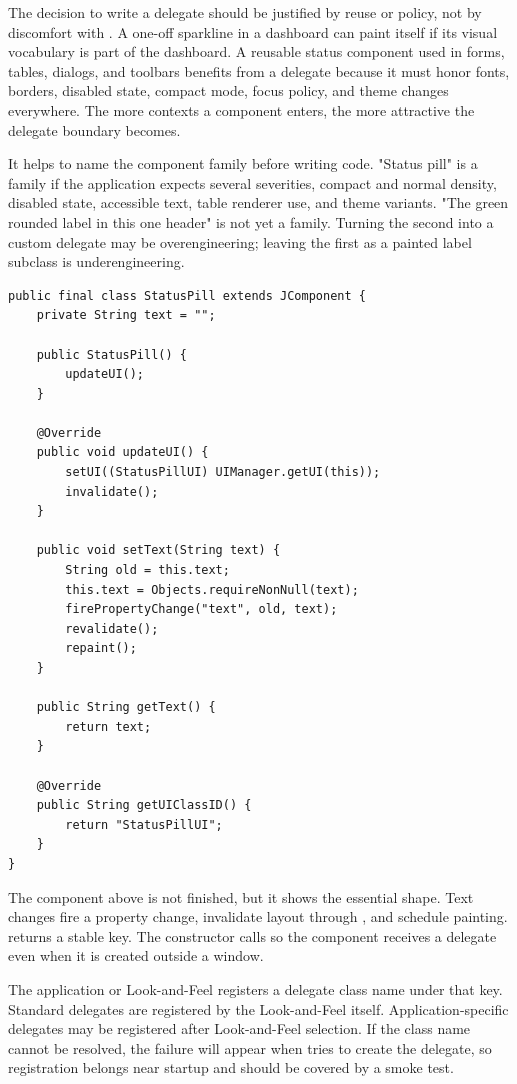 The decision to write a delegate should be justified by reuse or policy, not by discomfort with . A one-off sparkline in a dashboard can paint itself if its visual vocabulary is part of the dashboard. A reusable status component used in forms, tables, dialogs, and toolbars benefits from a delegate because it must honor fonts, borders, disabled state, compact mode, focus policy, and theme changes everywhere. The more contexts a component enters, the more attractive the delegate boundary becomes.

It helps to name the component family before writing code. "Status pill" is a family if the application expects several severities, compact and normal density, disabled state, accessible text, table renderer use, and theme variants. "The green rounded label in this one header" is not yet a family. Turning the second into a custom delegate may be overengineering; leaving the first as a painted label subclass is underengineering.

\begin{lstlisting}[caption={A custom component that delegates UI installation.}]
public final class StatusPill extends JComponent {
    private String text = "";

    public StatusPill() {
        updateUI();
    }

    @Override
    public void updateUI() {
        setUI((StatusPillUI) UIManager.getUI(this));
        invalidate();
    }

    public void setText(String text) {
        String old = this.text;
        this.text = Objects.requireNonNull(text);
        firePropertyChange("text", old, text);
        revalidate();
        repaint();
    }

    public String getText() {
        return text;
    }

    @Override
    public String getUIClassID() {
        return "StatusPillUI";
    }
}
\end{lstlisting}

The component above is not finished, but it shows the essential shape. Text changes fire a property change, invalidate layout through , and schedule painting.  returns a stable key. The constructor calls  so the component receives a delegate even when it is created outside a window.

The application or Look-and-Feel registers a delegate class name under that key. Standard delegates are registered by the Look-and-Feel itself. Application-specific delegates may be registered after Look-and-Feel selection. If the class name cannot be resolved, the failure will appear when  tries to create the delegate, so registration belongs near startup and should be covered by a smoke test.

